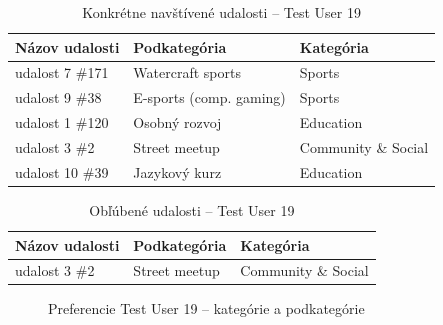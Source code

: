 \begin{table}[H]
\centering
\caption{Konkrétne navštívené udalosti – Test User 19}
\label{tab:eventy_u19}
\small
\begin{tabular}{|l|l|l|}
\hline
\textbf{Názov udalosti} & \textbf{Podkategória} & \textbf{Kategória} \\ \hline
udalost 7 \#171 & Watercraft sports        & Sports \\
udalost 9 \#38  & E-sports (comp. gaming)  & Sports \\
udalost 1 \#120 & Osobný rozvoj            & Education \\
udalost 3 \#2   & Street meetup            & Community \& Social \\
udalost 10 \#39 & Jazykový kurz            & Education \\ \hline
\end{tabular}
\end{table}

\begin{table}[H]
\centering
\caption{Obľúbené udalosti – Test User 19}
\label{tab:oblubene_u19}
\begin{tabular}{|l|l|l|}
\hline
\textbf{Názov udalosti} & \textbf{Podkategória} & \textbf{Kategória} \\ \hline
udalost 3 \#2 & Street meetup & Community \& Social \\ \hline
\end{tabular}
\end{table}

\begin{figure}[H]
\centering
\begin{minipage}{0.48\textwidth}
    \centering
    \caption{Hlavné kategórie}
\end{minipage}
\hfill
\begin{minipage}{0.48\textwidth}
    \centering
    \caption{Podkategórie}
\end{minipage}
\caption{Preferencie Test User 19 – kategórie a podkategórie}
\label{fig:profil_u19}
\end{figure}

